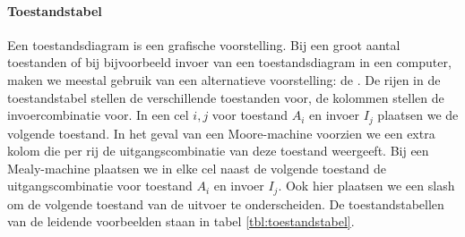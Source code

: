 \begin{table}[hbt]
\centering
{}
\caption{Toestandstabellen van de leidende voorbeelden.}
\label{tbl:toestandstabel}
\end{table}
\paragraph{Toestandstabel}Een toestandsdiagram is een grafische voorstelling. Bij een groot aantal toestanden of bij bijvoorbeeld invoer van een toestandsdiagram in een computer, maken we meestal gebruik van een alternatieve voorstelling: de . De rijen in de toestandstabel stellen de verschillende toestanden voor, de kolommen stellen de invoercombinatie voor. In een cel $i,j$ voor toestand $A_i$ en invoer $I_j$ plaatsen we de volgende toestand. In het geval van een Moore-machine voorzien we een extra kolom die per rij de uitgangscombinatie van deze toestand weergeeft. Bij een Mealy-machine plaatsen we in elke cel naast de volgende toestand de uitgangscombinatie voor toestand $A_i$ en invoer $I_j$. Ook hier plaatsen we een slash om de volgende toestand van de uitvoer te onderscheiden. De toestandstabellen van de leidende voorbeelden staan in tabel \ref{tbl:toestandstabel}.
